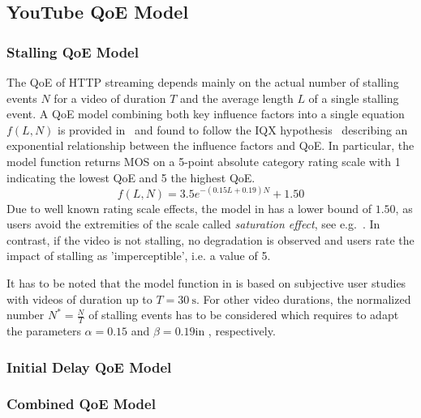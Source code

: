 \subsection{YouTube QoE Model}\label{sec:application:qoe_user_behaviour:typical_user_scenarios:youtube_qoe}
\subsubsection*{Stalling QoE Model}\label{sec:application:qoe_user_behaviour:typical_user_scenarios:youtube_qoe:stalling}
The \gls{QoE} of \gls{HTTP} streaming depends mainly on the actual number of stalling events \(N\) for a video of duration \(T\) and the average length \(L\) of a single stalling event.
A \gls{QoE} model combining both key influence factors into a single equation \(f(L,N)\) is provided in~\cite{Hossfeld2013c} and found to follow the IQX hypothesis~\cite{Fiedler2010} describing an exponential relationship between the influence factors and \gls{QoE}.
In particular, the model function returns \gls{MOS} on a 5-point absolute category rating scale with 1 indicating the lowest \gls{QoE} and 5 the highest \gls{QoE}. 
\begin{equation}
 f(L,N) = 3.5 e^{-(0.15L + 0.19)N}+1.50
\label{eq:application:qoe_user_behaviour:typical_user_scenarios:youtube_qoe:stalling:original_model}
\end{equation}
Due to well known rating scale effects, the model in  has a lower bound of \(1.50\), as users avoid the extremities of the scale called \emph{saturation effect}, see e.g.~\cite{Moller2000}.
In contrast, if the video is not stalling, no degradation is observed and users rate the impact of stalling as 'imperceptible', i.e. a value of 5.

It has to be noted that the model function in  is based on subjective user studies with videos of duration up to \(T=\SI{30}{\second}\).
For other video durations, the normalized number \(N^*=\frac{N}{T}\) of stalling events has to be considered which requires to adapt the parameters \(\alpha=0.15\) and \(\beta=0.19\)in , respectively. 

\subsubsection*{Initial Delay QoE Model}\label{sec:application:qoe_user_behaviour:typical_user_scenarios:initial_delay}
\subsubsection*{Combined QoE Model}\label{sec:application:qoe_user_behaviour:typical_user_scenarios:youtube_qoe:combined}
